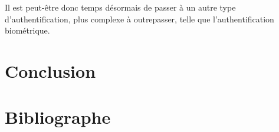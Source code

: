 \documentclass[12pt,a4paper]{article}
\begin{document}
Il est peut-être donc temps désormais de passer à un autre type d'authentification, plus complexe à outrepasser, telle que l'authentification biométrique.




\section*{Conclusion}

\section*{Bibliographe}
\end{document}
